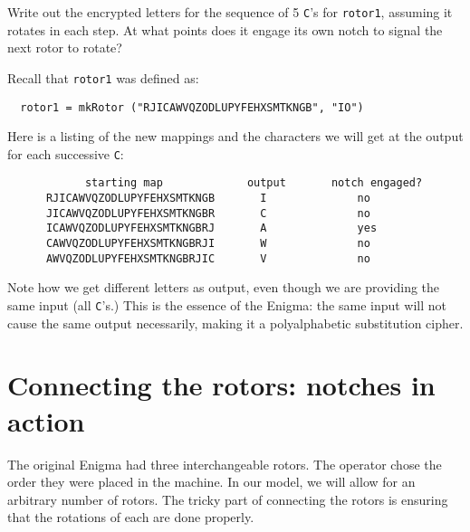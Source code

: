\begin{Exercise}\label{ex:enigma:2}
  Write out the encrypted letters for the sequence of 5 {\tt C}'s for
  {\tt rotor1}, assuming it rotates in each step. At what points does
  it engage its own notch to signal the next rotor to rotate?
\end{Exercise}
\begin{Answer}
Recall that {\tt rotor1} was defined as:
\begin{Verbatim}
  rotor1 = mkRotor ("RJICAWVQZODLUPYFEHXSMTKNGB", "IO")
\end{Verbatim}
Here is a listing of the new mappings and the characters we will get
at the output for each successive {\tt C}:
\begin{Verbatim}
            starting map             output       notch engaged?
      RJICAWVQZODLUPYFEHXSMTKNGB       I              no
      JICAWVQZODLUPYFEHXSMTKNGBR       C              no
      ICAWVQZODLUPYFEHXSMTKNGBRJ       A              yes
      CAWVQZODLUPYFEHXSMTKNGBRJI       W              no
      AWVQZODLUPYFEHXSMTKNGBRJIC       V              no
\end{Verbatim}
Note how we get different letters as output, even though we are
providing the same input (all {\tt C}'s.) This is the essence of the
Enigma: the same input will not cause the same output necessarily,
making it a polyalphabetic substitution cipher.\indPolyAlphSubst
\end{Answer}

\section{Connecting the rotors: notches in action}
\label{sec:enigma:notches}


The original Enigma had three interchangeable rotors. The operator
chose the order they were placed in the machine. In our model, we will
allow for an arbitrary number of rotors. The tricky part of connecting
the rotors is ensuring that the rotations of each are done properly.

